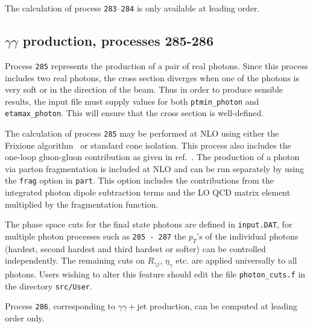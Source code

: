 \documentclass{article}
\begin{document}
{{{{{{The calculation of process {\tt 283}--{\tt 284} is only available at leading order.

\subsection{$\gamma\gamma$ production, processes 285-286}
\label{subsec:gamgam}

Process {\tt 285} represents the production of a pair of real photons.
Since this process includes two real photons, the cross section diverges
when one of the photons is very soft or in the direction of the beam.
Thus in order to produce sensible results, the input file must supply values for both
{\tt ptmin\_photon} and {\tt etamax\_photon}. This will ensure that
the cross section is well-defined.

The calculation of process {\tt 285} may be performed at NLO using either the
Frixione algorithm~\cite{Frixione:1998jh} or standard cone isolation.  This process also includes
the one-loop gluon-gluon contribution as given in
ref.~\cite{Bern:2002jx}.  The production of a photon via parton fragmentation is included at NLO and 
can be run separately by using the {\tt frag} option in {\tt part}. This option includes the contributions from the integrated 
photon dipole subtraction terms and the LO QCD matrix element multiplied by the fragmentation function.  


The phase space cuts for the final state photons are defined in {\tt{input.DAT}}, for multiple photon processes such 
as {\tt 285 - 287} the $p_T$'s of the individual photons (hardest, second hardest and third hardest or softer) can be controlled independently. 
The remaining cuts on $R_{\gamma j}$, $\eta_{\gamma}$ etc. are applied universally to all photons. Users wishing to alter
this feature should edit the file {\tt{photon\_cuts.f}} in the directory {\tt{src/User}}. 


Process {\tt 286}, corresponding to $\gamma\gamma+$jet production, can be computed at leading order only.

}}}}}}
\end{document}

